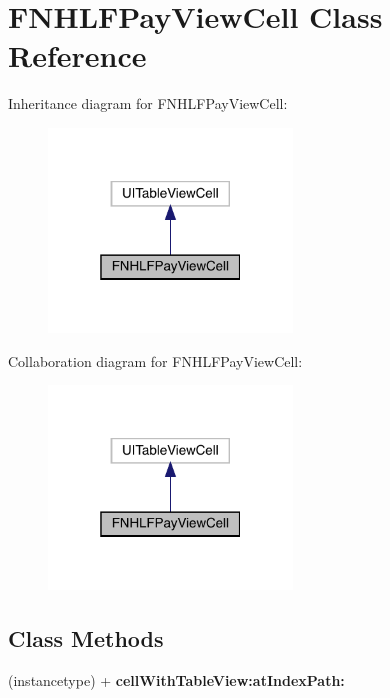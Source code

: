 \hypertarget{interface_f_n_h_l_f_pay_view_cell}{}\section{F\+N\+H\+L\+F\+Pay\+View\+Cell Class Reference}
\label{interface_f_n_h_l_f_pay_view_cell}


Inheritance diagram for F\+N\+H\+L\+F\+Pay\+View\+Cell\+:\nopagebreak
\begin{figure}[H]
\begin{center}
\leavevmode
\includegraphics[width=184pt]{interface_f_n_h_l_f_pay_view_cell__inherit__graph}
\end{center}
\end{figure}


Collaboration diagram for F\+N\+H\+L\+F\+Pay\+View\+Cell\+:\nopagebreak
\begin{figure}[H]
\begin{center}
\leavevmode
\includegraphics[width=184pt]{interface_f_n_h_l_f_pay_view_cell__coll__graph}
\end{center}
\end{figure}
\subsection*{Class Methods}
\begin{DoxyCompactItemize}
\item 
\mbox{\label{interface_f_n_h_l_f_pay_view_cell_a97a366ded3ce85cdce555d2084512fff}} 
(instancetype) + {\bfseries cell\+With\+Table\+View\+:at\+Index\+Path\+:}
\end{DoxyCompactItemize}
